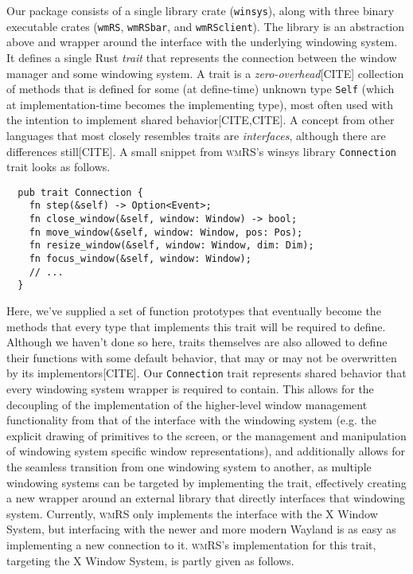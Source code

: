Our  package  consists  of  a  single  library  crate  (\texttt{winsys}),  along
with  three  binary  executable  crates  (\texttt{wmRS},  \texttt{wmRSbar},  and
\texttt{wmRSclient}). The library is an abstraction above and wrapper around the
interface  with  the underlying  windowing  system.  It  defines a  single  Rust
\textit{trait} that  represents the  connection between  the window  manager and
some windowing system.  A trait is a  \textit{zero-overhead}[CITE] collection of
methods that  is defined  for some (at  define-time) unknown  type \texttt{Self}
(which at  implementation-time becomes the  implementing type), most  often used
with the intention to implement shared behavior[CITE,CITE]. A concept from other
languages that  most closely resembles traits  are \textit{interfaces}, although
there are differences  still[CITE]. A small snippet  from \textsc{wmRS}'s winsys
library \texttt{Connection} trait looks as follows.

\begin{verbatim}
  pub trait Connection {
    fn step(&self) -> Option<Event>;
    fn close_window(&self, window: Window) -> bool;
    fn move_window(&self, window: Window, pos: Pos);
    fn resize_window(&self, window: Window, dim: Dim);
    fn focus_window(&self, window: Window);
    // ...
  }
\end{verbatim}

Here, we've  supplied a set  of function  prototypes that eventually  become the
methods that every  type that implements this trait will  be required to define.
Although we haven't  done so here, traits themselves are  also allowed to define
their functions with  some default behavior, that may or  may not be overwritten
by  its  implementors[CITE].  Our \texttt{Connection}  trait  represents  shared
behavior that every windowing system wrapper is required to contain. This allows
for the decoupling  of the implementation of the  higher-level window management
functionality from  that of the  interface with  the windowing system  (e.g. the
explicit drawing of primitives to the screen, or the management and manipulation
of windowing  system specific  window representations), and  additionally allows
for the  seamless transition from one  windowing system to another,  as multiple
windowing  systems  can  be  targeted by  implementing  the  trait,  effectively
creating a new wrapper around an  external library that directly interfaces that
windowing system.  Currently, \textsc{wmRS}  only implements the  interface with
the X Window System,  but interfacing with the newer and  more modern Wayland is
as easy as  implementing a new connection to  it. \textsc{wmRS}'s implementation
for this trait, targeting the X Window System, is partly given as follows.

